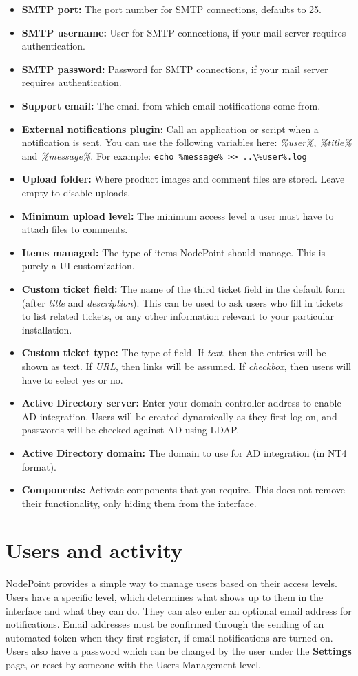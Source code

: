 \documentclass[11pt]{article}
\begin{document}
\begin{itemize}
\item \textbf{SMTP port:} The port number for SMTP connections, defaults to 25.
\item \textbf{SMTP username:} User for SMTP connections, if your mail server requires authentication.
\item \textbf{SMTP password:} Password for SMTP connections, if your mail server requires authentication.
\item \textbf{Support email:} The email from which email notifications come from.
\item \textbf{External notifications plugin:} Call an application or script when a notification is sent. You can use the following variables here: \textit{\%user\%}, \textit{\%title\%} and \textit{\%message\%}. For example: \texttt{echo \%message\% >> ..\textbackslash \%user\%.log}
\item \textbf{Upload folder:} Where product images and comment files are stored. Leave empty to disable uploads.
\item \textbf{Minimum upload level:} The minimum access level a user must have to attach files to comments.
\item \textbf{Items managed:} The type of items NodePoint should manage. This is purely a UI customization.
\item \textbf{Custom ticket field:} The name of the third ticket field in the default form (after \textit{title} and \textit{description}). This can be used to ask users who fill in tickets to list related tickets, or any other information relevant to your particular installation.
\item \textbf{Custom ticket type:} The type of field. If \textit{text}, then the entries will be shown as text. If \textit{URL}, then links will be assumed. If \textit{checkbox}, then users will have to select yes or no.
\item \textbf{Active Directory server:} Enter your domain controller address to enable AD integration. Users will be created dynamically as they first log on, and passwords will be checked against AD using LDAP.
\item \textbf{Active Directory domain:} The domain to use for AD integration (in NT4 format).
\item \textbf{Components:} Activate components that you require. This does not remove their functionality, only hiding them from the interface.
\end{itemize}

\section{Users and activity}
NodePoint provides a simple way to manage users based on their access levels. Users have a specific level, which determines what shows up to them in the interface and what they can do. They can also enter an optional email address for notifications. Email addresses must be confirmed through the sending of an automated token when they first register, if email notifications are turned on. Users also have a password which can be changed by the user under the \textbf{Settings} page, or reset by someone with the Users Management level.
\end{document}
